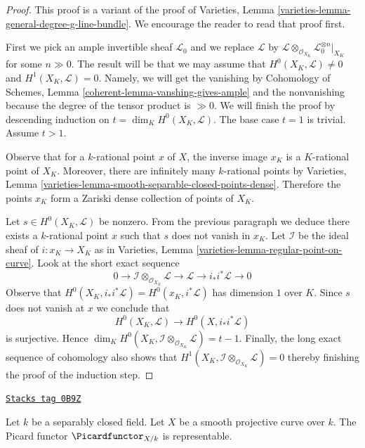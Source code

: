 \begin{proof}
This proof is a variant of the proof of
Varieties, Lemma \ref{varieties-lemma-general-degree-g-line-bundle}.
We encourage the reader to read that proof first.

\medskip\noindent
First we pick an ample invertible sheaf $\mathcal{L}_0$ and
we replace $\mathcal{L}$ by
$\mathcal{L} \otimes_{\mathcal{O}_{X_K}} \mathcal{L}_0^{\otimes n}|_{X_K}$
for some $n \gg 0$. The result will be that we may assume that
$H^0(X_K, \mathcal{L}) \not = 0$ and $H^1(X_K, \mathcal{L}) = 0$.
Namely, we will get the vanishing by Cohomology of Schemes, Lemma
\ref{coherent-lemma-vanshing-gives-ample} and the nonvanishing because
the degree of the tensor product is $\gg 0$.
We will finish the proof by descending induction on
$t = \dim_K H^0(X_K, \mathcal{L})$. The base case $t = 1$ is trivial.
Assume $t > 1$.

\medskip\noindent
Observe that for a $k$-rational point $x$ of $X$, the inverse image $x_K$
is a $K$-rational point of $X_K$. Moreover, there are infinitely many
$k$-rational points by Varieties, Lemma
\ref{varieties-lemma-smooth-separable-closed-points-dense}. Therefore
the points $x_K$ form a Zariski dense collection of points of $X_K$.

\medskip\noindent
Let $s \in H^0(X_K, \mathcal{L})$ be nonzero. From the previous paragraph
we deduce there exists a $k$-rational
point $x$ such that $s$ does not vanish in $x_K$. Let $\mathcal{I}$
be the ideal sheaf of $i : x_K \to X_K$ as in
Varieties, Lemma \ref{varieties-lemma-regular-point-on-curve}. Look at the
short exact sequence
$$
0 \to \mathcal{I} \otimes_{\mathcal{O}_{X_K}} \mathcal{L} \to
\mathcal{L} \to i_*i^*\mathcal{L} \to 0
$$
Observe that $H^0(X_K, i_*i^*\mathcal{L}) = H^0(x_K, i^*\mathcal{L})$
has dimension $1$ over $K$. Since $s$ does not vanish at $x$ we conclude that
$$
H^0(X_K, \mathcal{L}) \longrightarrow H^0(X, i_*i^*\mathcal{L})
$$
is surjective. Hence
$\dim_K H^0(X_K, \mathcal{I} \otimes_{\mathcal{O}_{X_K}} \mathcal{L}) = t - 1$.
Finally, the long exact sequence of cohomology also shows that
$H^1(X_K, \mathcal{I} \otimes_{\mathcal{O}_{X_K}} \mathcal{L}) = 0$
thereby finishing the proof of the induction step.
\end{proof}

\begin{proposition}
\label{pic-proposition-pic-curve}
\href{https://stacks.math.columbia.edu/tag/0B9Z}{\texttt{Stacks tag 0B9Z}}

Let $k$ be a separably closed field. Let $X$ be a smooth projective
curve over $k$. The Picard functor $\Picardfunctor_{X/k}$ is representable.
\end{proposition}

